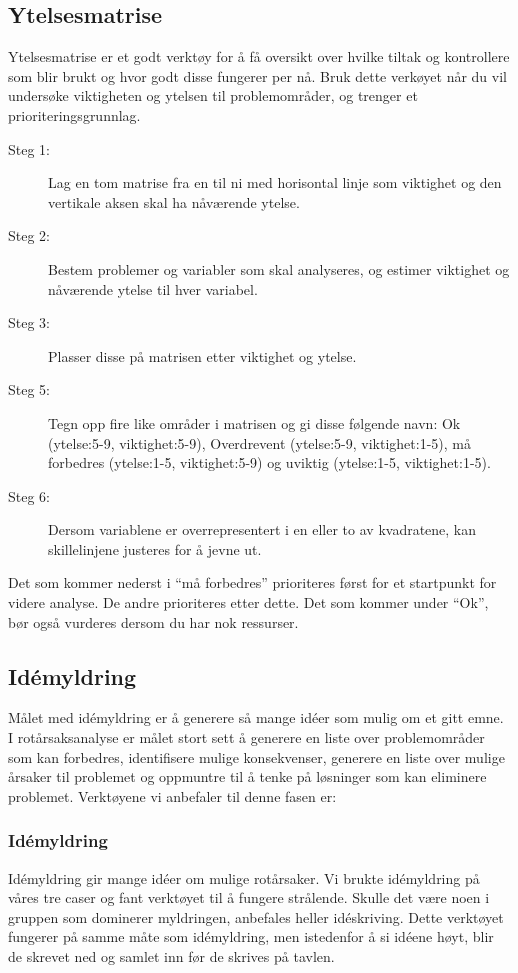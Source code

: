 \subsection{Ytelsesmatrise}
Ytelsesmatrise er et godt verktøy for å få oversikt over hvilke tiltak og kontrollere som blir brukt og hvor godt disse fungerer per nå. Bruk dette verkøyet når du vil undersøke viktigheten og ytelsen til problemområder, og trenger et prioriteringsgrunnlag. 

\begin{description}
    \item[Steg 1:] Lag en tom matrise fra en til ni med horisontal linje som viktighet og den vertikale aksen skal ha nåværende ytelse.
    \item[Steg 2:] Bestem problemer og variabler som skal analyseres, og estimer viktighet og nåværende ytelse til hver variabel.
    \item[Steg 3:] Plasser disse på matrisen etter viktighet og ytelse.
    \item[Steg 5:] Tegn opp fire like områder i matrisen og gi disse følgende navn: Ok (ytelse:5-9, viktighet:5-9), Overdrevent (ytelse:5-9, viktighet:1-5), må forbedres (ytelse:1-5, viktighet:5-9) og uviktig (ytelse:1-5, viktighet:1-5).
    \item[Steg 6:] Dersom variablene er overrepresentert i en eller to av kvadratene, kan skillelinjene justeres for å jevne ut.
\end{description}

Det som kommer nederst i ``må forbedres'' prioriteres først for et startpunkt for videre analyse. De andre prioriteres etter dette. Det som kommer under ``Ok'', bør også vurderes dersom du har nok ressurser. 

\subsection{Idémyldring}
Målet med idémyldring er å generere så mange idéer som mulig om et gitt emne. I rotårsaksanalyse er målet stort sett å generere en liste over problemområder som kan forbedres, identifisere mulige konsekvenser, generere en liste over mulige årsaker til problemet og oppmuntre til å tenke på løsninger som kan eliminere problemet. Verktøyene vi anbefaler til denne fasen er:

\subsubsection{Idémyldring} Idémyldring gir mange idéer om mulige rotårsaker. Vi brukte idémyldring på våres tre caser og fant verktøyet til å fungere strålende. Skulle det være noen i gruppen som dominerer myldringen, anbefales heller idéskriving. Dette verktøyet fungerer på samme måte som idémyldring, men istedenfor å si idéene høyt, blir de skrevet ned og samlet inn før de skrives på tavlen. 

